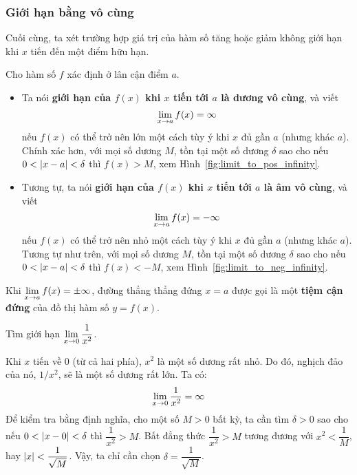 
\subsubsection{Giới hạn bằng vô cùng}

Cuối cùng, ta xét trường hợp giá trị của hàm số tăng hoặc giảm không giới hạn khi $x$ tiến đến một điểm hữu hạn.

\begin{definition}
    Cho hàm số $f$ xác định ở lân cận điểm $a$.
    \begin{itemize}
        \item Ta nói \textbf{giới hạn của $f(x)$ khi $x$ tiến tới $a$ là dương vô cùng}, và viết
        \begin{equation*}
            \lim\limits_{x \to a} f(x) = \infty
        \end{equation*}
        nếu $f(x)$ có thể trở nên lớn một cách tùy ý khi $x$ đủ gần $a$ (nhưng khác $a$). Chính xác hơn, với mọi số dương $M$, tồn tại một số dương $\delta$ sao cho nếu $0 < \left\lvert x-a \right\rvert < \delta$ thì $f(x) > M$, xem Hình~\ref{fig:limit_to_pos_infinity}.
        
        \item Tương tự, ta nói \textbf{giới hạn của $f(x)$ khi $x$ tiến tới $a$ là âm vô cùng}, và viết
        \begin{equation*}
            \lim\limits_{x \to a} f(x) = -\infty
        \end{equation*}
        nếu $f(x)$ có thể trở nên nhỏ một cách tùy ý khi $x$ đủ gần $a$ (nhưng khác $a$). Tương tự như trên, với mọi số dương $M$, tồn tại một số dương $\delta$ sao cho nếu $0 < \left\lvert x-a \right\rvert < \delta$ thì $f(x) < -M$, xem Hình~\ref{fig:limit_to_neg_infinity}.
    \end{itemize}
\end{definition}

Khi $\lim\limits_{x \to a} f(x) = \pm\infty$, đường thẳng thẳng đứng $x=a$ được gọi là một \textbf{tiệm cận đứng} của đồ thị hàm số $y=f(x)$.







\begin{example}
    Tìm giới hạn $\lim\limits_{x \to 0} \dfrac{1}{x^2}$.
    
    Khi $x$ tiến về 0 (từ cả hai phía), $x^2$ là một số dương rất nhỏ. Do đó, nghịch đảo của nó, $1/x^2$, sẽ là một số dương rất lớn. Ta có:
    \begin{equation*}
        \lim\limits_{x \to 0} \dfrac{1}{x^2} = \infty
    \end{equation*}
    Để kiểm tra bằng định nghĩa, cho một số $M > 0$ bất kỳ, ta cần tìm $\delta > 0$ sao cho nếu $0 < \left\lvert x-0 \right\rvert < \delta$ thì $\dfrac{1}{x^2} > M$.
    Bất đẳng thức $\dfrac{1}{x^2} > M$ tương đương với $x^2 < \dfrac{1}{M}$, hay $\left\lvert x \right\rvert < \dfrac{1}{\sqrt{M}}$.
    Vậy, ta chỉ cần chọn $\delta = \dfrac{1}{\sqrt{M}}$.
\end{example}


